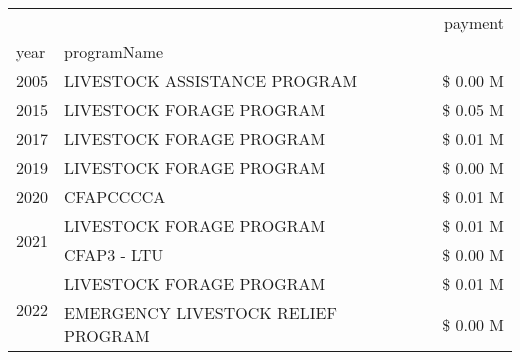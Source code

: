 \begin{tabular}{llr}
\toprule
 &  & payment \\
year & programName &  \\
\midrule
2005 & LIVESTOCK ASSISTANCE PROGRAM & \$ 0.00 M \\
\cline{1-3}
2015 & LIVESTOCK FORAGE PROGRAM & \$ 0.05 M \\
\cline{1-3}
2017 & LIVESTOCK FORAGE PROGRAM & \$ 0.01 M \\
\cline{1-3}
2019 & LIVESTOCK FORAGE PROGRAM & \$ 0.00 M \\
\cline{1-3}
2020 & CFAPCCCCA & \$ 0.01 M \\
\cline{1-3}
\multirow[t]{2}{*}{2021} & LIVESTOCK FORAGE PROGRAM & \$ 0.01 M \\
 & CFAP3 - LTU & \$ 0.00 M \\
\cline{1-3}
\multirow[t]{2}{*}{2022} & LIVESTOCK FORAGE PROGRAM & \$ 0.01 M \\
 & EMERGENCY LIVESTOCK RELIEF PROGRAM & \$ 0.00 M \\
\cline{1-3}
\bottomrule
\end{tabular}
